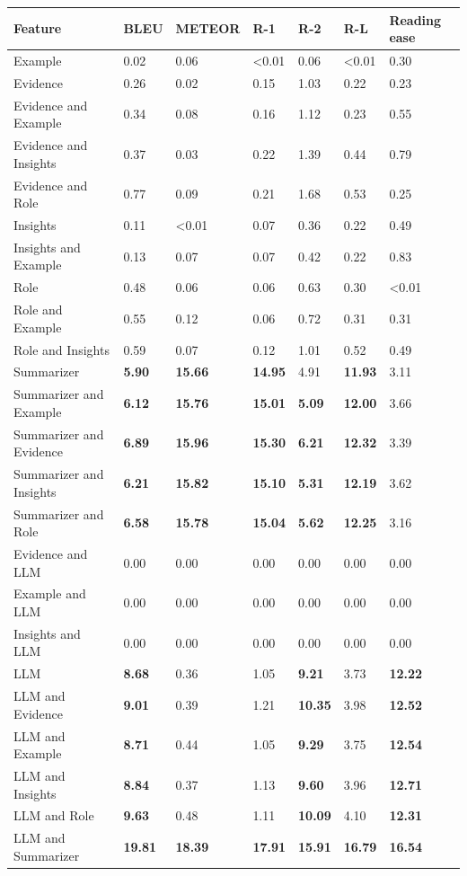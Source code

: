 \begin{tabular}{|l|l|l|l|l|l|l|}
\hline
\textbf{Feature} & BLEU & METEOR & R-1 & R-2 & R-L & Reading ease \\
 \hline
 Example & 0.02 & 0.06 & \textless{}0.01 & 0.06 & \textless{}0.01 & 0.30 \\
 \hline
 Evidence & 0.26 & 0.02 & 0.15 & 1.03 & 0.22 & 0.23 \\
 \hline
 Evidence and Example & 0.34 & 0.08 & 0.16 & 1.12 & 0.23 & 0.55 \\
 \hline
 Evidence and Insights & 0.37 & 0.03 & 0.22 & 1.39 & 0.44 & 0.79 \\
 \hline
 Evidence and Role & 0.77 & 0.09 & 0.21 & 1.68 & 0.53 & 0.25 \\
 \hline
 Insights & 0.11 & \textless{}0.01 & 0.07 & 0.36 & 0.22 & 0.49 \\
 \hline
 Insights and Example & 0.13 & 0.07 & 0.07 & 0.42 & 0.22 & 0.83 \\
 \hline
 Role & 0.48 & 0.06 & 0.06 & 0.63 & 0.30 & \textless{}0.01 \\
 \hline
 Role and Example & 0.55 & 0.12 & 0.06 & 0.72 & 0.31 & 0.31 \\
 \hline
 Role and Insights & 0.59 & 0.07 & 0.12 & 1.01 & 0.52 & 0.49 \\
 \hline
 Summarizer & \textbf{5.90} & \textbf{15.66} & \textbf{14.95} & 4.91 & \textbf{11.93} & 3.11 \\
 \hline
 Summarizer and Example & \textbf{6.12} & \textbf{15.76} & \textbf{15.01} & \textbf{5.09} & \textbf{12.00} & 3.66 \\
 \hline
 Summarizer and Evidence & \textbf{6.89} & \textbf{15.96} & \textbf{15.30} & \textbf{6.21} & \textbf{12.32} & 3.39 \\
 \hline
 Summarizer and Insights & \textbf{6.21} & \textbf{15.82} & \textbf{15.10} & \textbf{5.31} & \textbf{12.19} & 3.62 \\
 \hline
 Summarizer and Role & \textbf{6.58} & \textbf{15.78} & \textbf{15.04} & \textbf{5.62} & \textbf{12.25} & 3.16 \\
 \hline
 Evidence and LLM & 0.00 & 0.00 & 0.00 & 0.00 & 0.00 & 0.00 \\
 \hline
 Example and LLM & 0.00 & 0.00 & 0.00 & 0.00 & 0.00 & 0.00 \\
 \hline
 Insights and LLM & 0.00 & 0.00 & 0.00 & 0.00 & 0.00 & 0.00 \\
 \hline
 LLM & \textbf{8.68} & 0.36 & 1.05 & \textbf{9.21} & 3.73 & \textbf{12.22} \\
 \hline
 LLM and Evidence & \textbf{9.01} & 0.39 & 1.21 & \textbf{10.35} & 3.98 & \textbf{12.52} \\
 \hline
 LLM and Example & \textbf{8.71} & 0.44 & 1.05 & \textbf{9.29} & 3.75 & \textbf{12.54} \\
 \hline
 LLM and Insights & \textbf{8.84} & 0.37 & 1.13 & \textbf{9.60} & 3.96 & \textbf{12.71} \\
 \hline
 LLM and Role & \textbf{9.63} & 0.48 & 1.11 & \textbf{10.09} & 4.10 & \textbf{12.31} \\
 \hline
 LLM and Summarizer & \textbf{19.81} & \textbf{18.39} & \textbf{17.91} & \textbf{15.91} & \textbf{16.79} & \textbf{16.54} \\
\hline
\end{tabular}
